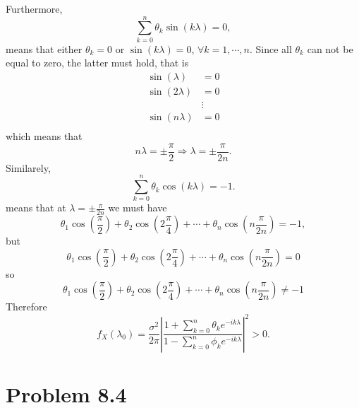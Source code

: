 \documentclass[11pt, oneside]{article}   	%
\begin{document}
\justify
Furthermore,
\begin{equation}
\sum_{k=0}^{n}\theta_{k}\sin(k\lambda) = 0,  \nonumber
\end{equation}
means that 
either $\theta_{k} = 0$ or $\sin(k\lambda) = 0$, $\forall k=1, \cdots, n$. Since all $\theta_{k}$ can not be equal to zero, the latter must hold, that is 
\begin{equation}
\begin{split}
\sin(\lambda) &= 0\\
\sin(2\lambda) &= 0\\
&\vdots\\
\sin(n\lambda) &= 0\\  \nonumber
\end{split}
\end{equation}
which means that 
\begin{equation}
n\lambda = \pm\frac{\pi}{2} \Rightarrow \lambda = \pm\frac{\pi}{2n} .
\end{equation}
Similarely,
\begin{equation}
 \sum_{k=0}^{n}\theta_{k}\cos(k\lambda)  = -1.  \nonumber
\end{equation}
means that at $\lambda = \pm\frac{\pi}{2n}$ we must have
\begin{equation}
\theta_{1}\cos\left(\frac{\pi}{2}\right) + \theta_{2}\cos\left(2\frac{\pi}{4}\right)+\cdots + \theta_{n}\cos\left(n\frac{\pi}{2n}\right) = -1\nonumber,
\end{equation}
but 
\begin{equation}
\theta_{1}\cos\left(\frac{\pi}{2}\right) + \theta_{2}\cos\left(2\frac{\pi}{4}\right)+\cdots + \theta_{n}\cos\left(n\frac{\pi}{2n}\right) = 0 \nonumber
\end{equation}
so 
\begin{equation}
\theta_{1}\cos\left(\frac{\pi}{2}\right) + \theta_{2}\cos\left(2\frac{\pi}{4}\right)+\cdots + \theta_{n}\cos\left(n\frac{\pi}{2n}\right) \neq -1\nonumber
\end{equation}
Therefore 
\begin{equation}
f_{X}(\lambda_{0}) = \frac{\sigma^{2}}{2\pi}\left|\frac{ 1+\sum_{k=0}^{n}\theta_{k}e^{-ik\lambda}}{ 1-\sum_{k=0}^{n}\phi_{k}e^{-ik\lambda}}\right|^{2} > 0.  \nonumber
\end{equation}








\section{Problem 8.4}
\end{document}
